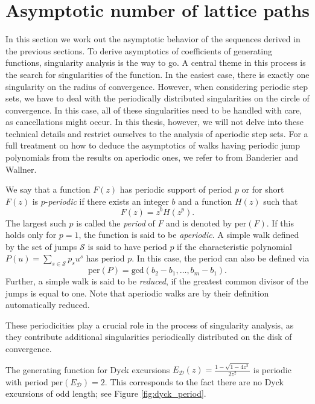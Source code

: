 \section{Asymptotic number of lattice paths}

In this section we work out the asymptotic behavior of the sequences derived in the previous sections. To derive asymptotics of coefficients of generating functions, singularity analysis is the way to go. A central theme in this process is the search for singularities of the function. In the easiest case, there is exactly one singularity on the radius of convergence.
However, when considering periodic step sets, we have to deal with the periodically distributed singularities on the circle of convergence. In this case, all of these singularities need to be handled with care, as cancellations might occur. In this thesis, however, we will not delve into these technical details and restrict ourselves to the analysis of aperiodic step sets.
For a full treatment on how to deduce the asymptotics of walks having periodic jump polynomials from the results on aperiodic ones, we refer to \cite[Lemma 8.7 and Theorem 8.8]{RationalSlope} from Banderier and Wallner.

\begin{definition}
  We say that a function $F(z)$ has periodic support of period $p$ or for short $F(z)$ is $p$-\textit{periodic} if there exists an integer $b$ and a function $H(z)$ such that 
  $$
    F(z) = z^b H(z^p).
  $$
  The largest such $p$ is called the \textit{period} of $F$ and is denoted by $\mathrm{per}(F)$. If this holds only for $p = 1$, the function is said to be \textit{aperiodic}.
  A simple walk defined by the set of jumps $\mathcal{S}$ is said to have period $p$ if the characteristic polynomial $P(u) = \sum_{s \in \mathcal{S}} p_s u^s$ has period $p$. 
  In this case, the period can also be defined via 
  $$
  \mathrm{per}(P) = \mathrm{gcd}(b_2-b_1,\dots,b_m - b_1).
  $$
  Further, a simple walk is said to be \textit{reduced}, if the greatest common divisor of the jumps is equal to one.
  Note that aperiodic walks are by their definition automatically reduced.
\end{definition}

These periodicities play a crucial role in the process of singularity analysis, as they contribute additional singularities periodically distributed on the disk of convergence.

\begin{example}
  The generating function for Dyck excursions $E_\mathcal{D}(z) = \frac{1 - \sqrt{1 - 4z^{2}}}{2z^{2}}$ is periodic with period $\mathrm{per}(E_\mathcal{D}) = 2$. This corresponds to the fact there are no Dyck excursions of odd length; see Figure \ref{fig:dyck_period}.
\end{example}

